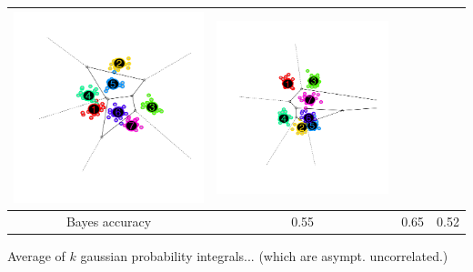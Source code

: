 \documentclass{beamer}
\begin{document}
\begin{frame}
\begin{center}
\begin{tabular}{c|c|c|c}
\includegraphics[scale = 0.15, clip = true, trim = 0.6in 0.2in 0.6in 0.2in]{../info_theory_paper/gaussian_figure1b.png} &
\includegraphics[scale = 0.15, clip = true, trim = 0.6in 0.2in 0.6in 0.2in]{../info_theory_paper/gaussian_figure1c.png}\\\hline
Bayes accuracy & 0.55 & 0.65 & 0.52 \\
\end{tabular}
\end{center}
Average of $k$ gaussian probability integrals... (which are asympt. uncorrelated.)
\end{frame}
\end{document}
